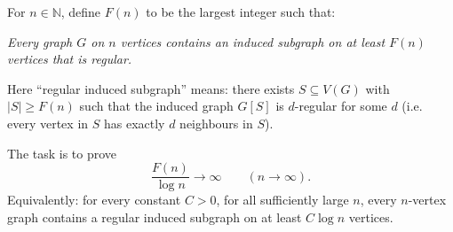 For $n\in\mathbb{N}$, define $F(n)$ to be the largest integer such that:

\emph{Every graph $G$ on $n$ vertices contains an induced subgraph on at least $F(n)$ vertices that is regular.}

Here ``regular induced subgraph'' means: there exists $S\subseteq V(G)$ with $|S|\ge F(n)$ such that the induced graph $G[S]$ is $d$-regular for some $d$ (i.e. every vertex in $S$ has exactly $d$ neighbours in $S$).

The task is to prove
\[
\frac{F(n)}{\log n}\to \infty\qquad (n\to\infty).
\]
Equivalently: for every constant $C>0$, for all sufficiently large $n$, every $n$-vertex graph contains a regular induced subgraph on at least $C\log n$ vertices.
